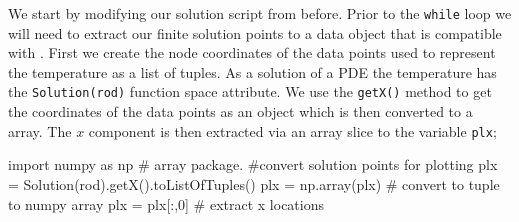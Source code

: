 We start by modifying our solution script from before.
Prior to the \verb|while| loop we will need to extract our finite solution points to a data object that is compatible with \mpl. First we create the node coordinates of the data points used to represent
the temperature as a \pyt list of tuples. As a solution of a PDE 
the temperature has the \verb|Solution(rod)| function space attribute. We use 
the \verb|getX()| method to get the coordinates of the data points as an \esc object 
which is then converted to a \numpy array. The $x$ component is then extracted via an array slice to the variable \verb|plx|; 
\begin{python}
import numpy as np # array package.
#convert solution points for plotting
plx = Solution(rod).getX().toListOfTuples() 
plx = np.array(plx) # convert to tuple to numpy array
plx = plx[:,0] # extract x locations
\end{python}

